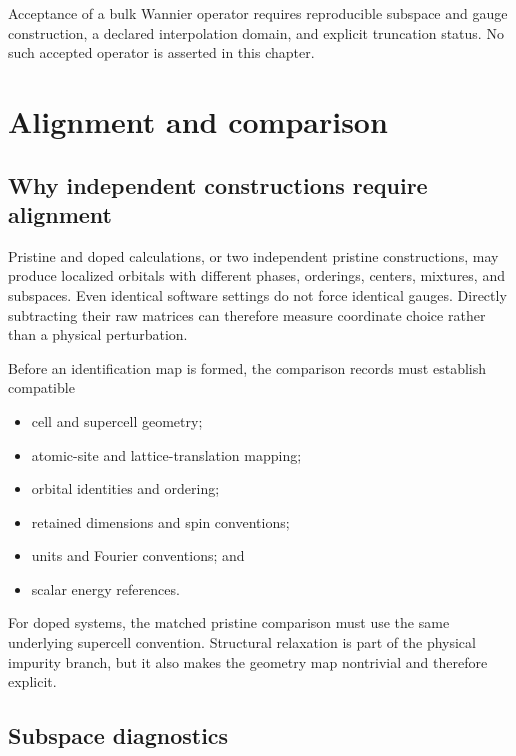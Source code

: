 Acceptance of a bulk Wannier operator requires reproducible subspace and gauge
construction, a declared interpolation domain, and explicit truncation status.
No such accepted operator is asserted in this chapter.

\section{Alignment and comparison}

\subsection{Why independent constructions require alignment}


Pristine and doped calculations, or two independent pristine constructions, may
produce localized orbitals with different phases, orderings, centers, mixtures,
and subspaces. Even identical software settings do not force identical gauges.
Directly subtracting their raw matrices can therefore measure coordinate choice
rather than a physical perturbation.

Before an identification map is formed, the comparison records must establish
compatible

\begin{itemize}
  \item cell and supercell geometry;
  \item atomic-site and lattice-translation mapping;
  \item orbital identities and ordering;
  \item retained dimensions and spin conventions;
  \item units and Fourier conventions; and
  \item scalar energy references.
\end{itemize}

For doped systems, the matched pristine comparison must use the same underlying
supercell convention. Structural relaxation is part of the physical impurity
branch, but it also makes the geometry map nontrivial and therefore explicit.

\subsection{Subspace diagnostics}


